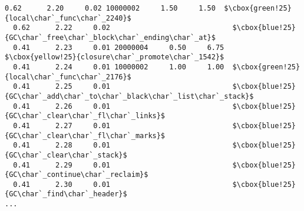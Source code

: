 \begin{lstlisting}[basicstyle=\linespread{0.8}\ttfamily\footnotesize,
basewidth={.4em,.2em}, frame=single]
  0.62      2.20     0.02 10000002     1.50     1.50  $\cbox{green!25}{local\char`_func\char`_2240}$
  0.62      2.22     0.02                             $\cbox{blue!25}{GC\char`_free\char`_block\char`_ending\char`_at}$
  0.41      2.23     0.01 20000004     0.50     6.75  $\cbox{yellow!25}{closure\char`_promote\char`_1542}$
  0.41      2.24     0.01 10000002     1.00     1.00  $\cbox{green!25}{local\char`_func\char`_2176}$
  0.41      2.25     0.01                             $\cbox{blue!25}{GC\char`_add\char`_to\char`_black\char`_list\char`_stack}$
  0.41      2.26     0.01                             $\cbox{blue!25}{GC\char`_clear\char`_fl\char`_links}$
  0.41      2.27     0.01                             $\cbox{blue!25}{GC\char`_clear\char`_fl\char`_marks}$
  0.41      2.28     0.01                             $\cbox{blue!25}{GC\char`_clear\char`_stack}$
  0.41      2.29     0.01                             $\cbox{blue!25}{GC\char`_continue\char`_reclaim}$
  0.41      2.30     0.01                             $\cbox{blue!25}{GC\char`_find\char`_header}$
...
\end{lstlisting}
